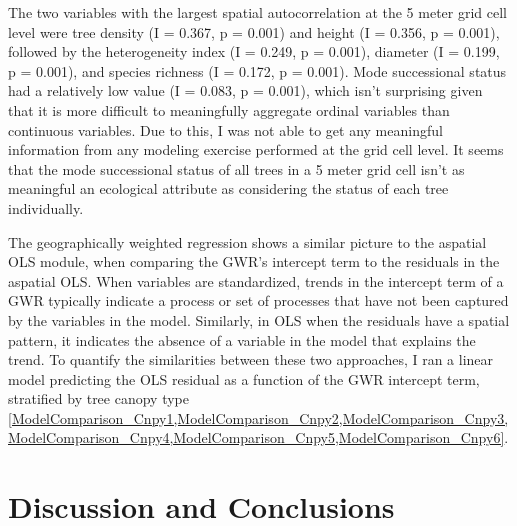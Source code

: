 \documentclass[12pt,a4paper]{article}
\begin{document}
The two variables with the largest spatial autocorrelation at the 5 meter grid cell level were tree density (I = 0.367, p = 0.001) and height (I = 0.356, p = 0.001), followed by the  heterogeneity index (I = 0.249, p = 0.001), diameter (I = 0.199, p = 0.001), and species richness (I = 0.172, p = 0.001).  Mode successional status had a relatively low value (I = 0.083, p = 0.001), which isn't surprising given that it is more difficult to meaningfully aggregate ordinal variables than continuous variables.  Due to this, I was not able to get any meaningful information from any modeling exercise performed at the grid cell level.  It seems that the mode successional status of all trees in a 5 meter grid cell isn't as meaningful an ecological attribute as considering the status of each tree individually. 

The geographically weighted regression shows a similar picture to the aspatial OLS module, when comparing the GWR's intercept term to the residuals in the aspatial OLS.  When variables are standardized, trends in the intercept term of a GWR typically indicate a process or set of processes that have not been captured by the variables in the model.  Similarly, in OLS when the residuals have a spatial pattern, it indicates the absence of a variable in the model that explains the trend.  To quantify the similarities between these two approaches, I ran a linear model predicting the OLS residual as a function of the GWR intercept term, stratified by tree canopy type \cref{ModelComparison_Cnpy1,ModelComparison_Cnpy2,ModelComparison_Cnpy3,ModelComparison_Cnpy4,ModelComparison_Cnpy5,ModelComparison_Cnpy6}.

\section{Discussion and Conclusions}
\end{document}

